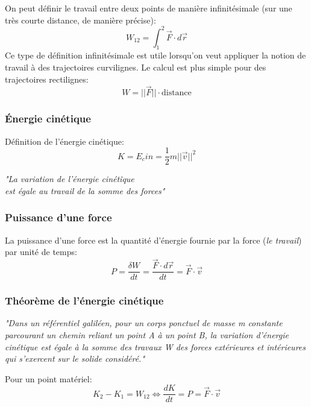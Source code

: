 \documentclass{article}
\numberwithin{equation}{section}
\begin{document}
On peut définir le travail entre deux points de manière infinitésimale (sur une très courte distance, de manière précise):
\begin{equation}
	\boxed{ W_{12} = \int_1^2 \vec F \cdot d \vec r }
\end{equation}
Ce type de définition infinitésimale est utile lorsqu'on veut appliquer la notion de travail à des trajectoires curvilignes. Le calcul est plus simple pour des trajectoires rectilignes:
\begin{equation}
	\boxed{ W = ||\vec F|| \cdot \text{distance} }
\end{equation}

\subsubsection{Énergie cinétique}
Définition de l'énergie cinétique:
\begin{equation}
	\boxed{ K = E_cin = \frac{1}{2} m ||\vec v||^2 }
\end{equation}

\begin{center}
	\emph{"La variation de l'énergie cinétîque \\ est égale au travail de la somme des forces"}
\end{center}


\subsubsection{Puissance d'une force}
La puissance d'une force est la quantité d'énergie fournie par la force (\emph{le travail}) par unité de temps:
\begin{equation}
	\boxed{ P = \frac{\delta W}{dt} = \frac{\vec F \cdot d \vec r}{dt} = \vec F \cdot \vec v}
\end{equation}

\subsubsection{Théorème de l'énergie cinétique}

\begin{center}
	\emph{"Dans un référentiel galiléen, pour un corps ponctuel de masse m constante parcourant un chemin reliant un point A à un point B, la variation d'énergie cinétique est égale à la somme des travaux W des forces extérieures et intérieures qui s'exercent sur le solide considéré."}
\end{center}
Pour un point matériel:
\begin{equation}
	\boxed{ K_2 - K_1 = W_{12} \Leftrightarrow \frac{dK}{dt} = P = \vec F \cdot \vec v }
\end{equation}
\end{document}
